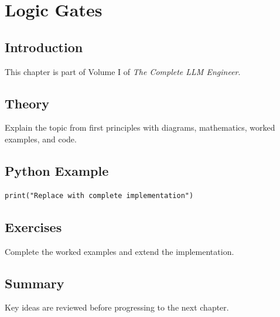 \chapter{Logic Gates}
\label{chap:logic-gates}



\section{Introduction}
This chapter is part of Volume I of \emph{The Complete LLM Engineer}.

\section{Theory}
Explain the topic from first principles with diagrams, mathematics, worked examples,
and code.

\section{Python Example}
\begin{lstlisting}
print("Replace with complete implementation")
\end{lstlisting}

\section{Exercises}
\begin{exercise}
Complete the worked examples and extend the implementation.
\end{exercise}

\section{Summary}
Key ideas are reviewed before progressing to the next chapter.
